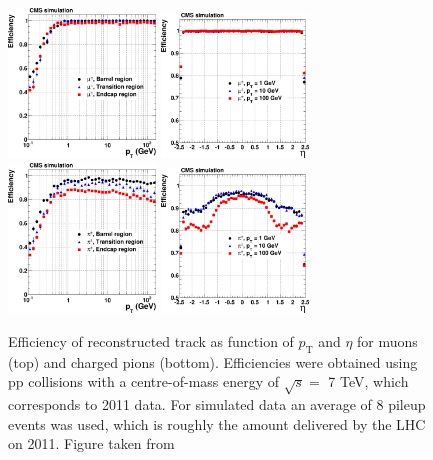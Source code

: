 \begin{figure}[ht]
  \begin{center}
    \includegraphics[width=0.35\textwidth]{figuras/Chapter3/TrackEff_Muon_pt.png}
    \includegraphics[width=0.35\textwidth]{figuras/Chapter3/TrackEff_Muon_eta.png}
    \includegraphics[width=0.35\textwidth]{figuras/Chapter3/TrackEff_Pion_pt.png}
    \includegraphics[width=0.35\textwidth]{figuras/Chapter3/TrackEff_Pion_eta.png}
    \caption{Efficiency of reconstructed track as function of $p_{\textrm{T}}$ and $\eta$ for 
    muons (top) and charged pions (bottom). Efficiencies were obtained using pp collisions with a centre-of-mass 
    energy of $\sqrt{s} =$  7 TeV, which corresponds to 2011 data. For simulated data an average of 8 pileup 
    events was used, which is roughly the amount delivered by the LHC on 2011. Figure taken from \cite{Chatrchyan:2014fea}}
    \label{fig:Track_Efficiencies}
  \end{center}
\end{figure}

